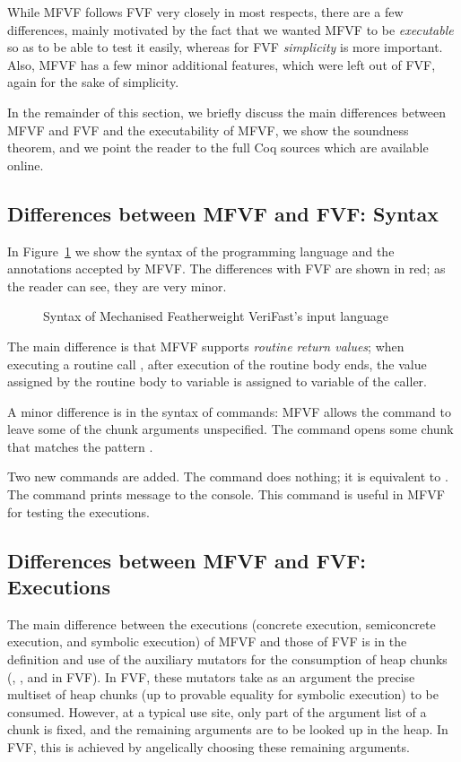 \documentclass{CSML}
\theoremstyle{definition}\newtheorem{notation}[thm]{Notation}
\theoremstyle{plain}\newtheorem{satz}[thm]{Satz}
\begin{document}
While MFVF follows FVF very closely in most respects, there are a few 
differences, mainly motivated by the fact that we wanted MFVF to be 
\emph{executable} so as to be able to test it easily, whereas for FVF 
\emph{simplicity} is more important. Also, MFVF has a few minor additional 
features, which were left out of FVF, again for the sake of simplicity.

In the remainder of this section, we briefly discuss the main differences 
between MFVF and FVF and the executability of MFVF, we show the soundness 
theorem, and we point the reader to the full Coq sources which are 
available online.

\subsection{Differences between MFVF and FVF: Syntax}

In Figure~\ref{fig:mfvf} we show the syntax of the programming language and the annotations 
accepted by MFVF. The differences with FVF are shown in red; as the reader 
can see, they are very minor.

\begin{figure}

\caption{Syntax of Mechanised Featherweight VeriFast's input language}\label{fig:mfvf}
\end{figure}

The main difference is that MFVF supports \emph{routine return values}; 
when executing a routine call , after execution of 
the routine body ends, the value assigned by the routine body to variable 
 is assigned to variable  of the caller.

A minor difference is in the syntax of  commands: MFVF allows the command to leave some of the chunk arguments unspecified.
The command  opens some chunk that matches the pattern .

Two new commands are added. The  command does nothing; it is equivalent to .
The command  prints message  to the console.
This command is useful in MFVF for testing the executions.

\subsection{Differences between MFVF and FVF: Executions}

The main difference between the executions (concrete execution, 
semiconcrete execution, and symbolic execution) of MFVF and those of FVF 
is in the definition and use of the auxiliary mutators for the consumption 
of heap chunks (, , and 
 in FVF). In FVF, these mutators take as an 
argument the precise multiset of heap chunks (up to provable equality for 
symbolic execution) to be consumed. However, at a typical use site, only 
part of the argument list of a chunk is fixed, and the remaining arguments 
are to be looked up in the heap. In FVF, this is achieved by angelically 
choosing these remaining arguments.
\end{document}

